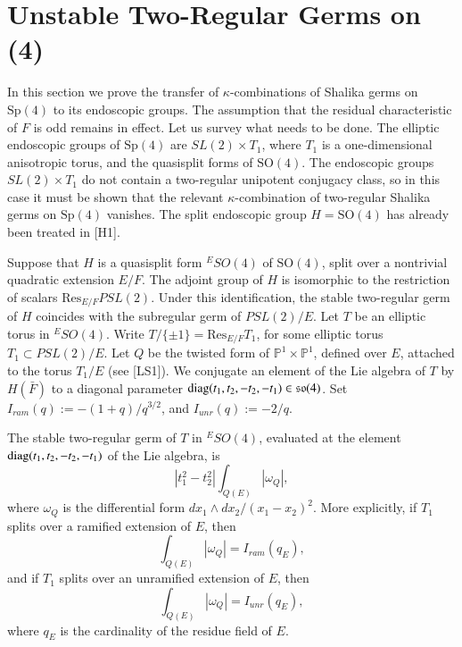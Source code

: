 \documentclass{amsart}
\newcommand\bP{{\mathbb P}}
\newcommand\diag{\hbox{diag}}
\newcommand\so{{\mathfrak s\mathfrak o}}
\newcommand\bF{{\bar F}}
\newenvironment{cthm}[1]
  {\renewcommand\thethm{\sc #1}\thm}
  {\endthm}
\begin{document}
\section{Unstable Two-Regular Germs on (4)}

In this section we prove the transfer of $\kappa$-combinations
of Shalika germs on $\text{Sp}(4)$ to its endoscopic groups.
The assumption that the residual characteristic of $F$
is odd remains in effect.  Let
us survey what needs to be done.  The elliptic
endoscopic groups of $\text{Sp}(4)$ are $SL(2)\times T_1$, where
$T_1$ is a one-dimensional anisotropic torus, and the
quasisplit forms of $\text{SO}(4)$.  The endoscopic groups
$SL(2)\times T_1$ do not contain a two-regular unipotent
conjugacy class, so in this case it must be shown that
the relevant $\kappa$-combination of two-regular Shalika
germs on $\text{Sp}(4)$ vanishes.  The split endoscopic group
$H=\text{SO}(4)$ has already been treated in [H1].  

Suppose that
$H$ is a quasisplit form ${}^ESO(4)$ of $\text{SO}(4)$, split over
a nontrivial quadratic extension $E/F$.  The adjoint group
of $H$ is isomorphic to the restriction of scalars
$\text{Res}_{E/F}PSL(2)$.  Under this identification,
the stable two-regular germ
of $H$ coincides with the subregular germ of
$PSL(2)/E$.
Let $T$ be an elliptic torus in ${}^ESO(4)$.
Write $T/\{\pm1\} = \text{Res}_{E/F} T_1$, for some
elliptic torus $T_1\subset PSL(2)/E$.  Let $Q$ be the twisted form
of $\bP^1\times \bP^1$, defined over $E$, attached to the
torus $T_1/E$ (see [LS1]).  We conjugate an element of the
Lie algebra of $T$ by $H(\bF)$ to a diagonal parameter
$\diag(t_1,t_2,-t_2,-t_1)\in \so(4)$.
Set $I_{ram}(q):= -(1+q)/q^{3/2}$, and $I_{unr}(q):= -2/q$.

\bigskip
\noindent
\begin{cthm}{Lemma 5.1} The stable two-regular germ of $T$ in ${}^ESO(4)$,
evaluated at the element $\diag(t_1,t_2,-t_2,-t_1)$ of the
Lie algebra, is
$$|t_1^2-t_2^2| \int_{Q(E)} |\omega_Q|,$$
where $\omega_Q$ is the differential form $dx_1\wedge dx_2/(x_1-x_2)^2$.
More explicitly, if $T_1$ splits over a ramified
extension of $E$, then
$$\int_{Q(E)} |\omega_Q| = I_{ram}(q_E),$$
and if $T_1$ splits over an unramified extension of $E$, then
$$\int_{Q(E)} |\omega_Q| = I_{unr}(q_E),$$
where $q_E$ is the cardinality of the residue field of $E$.
\end{cthm}
\end{document}

